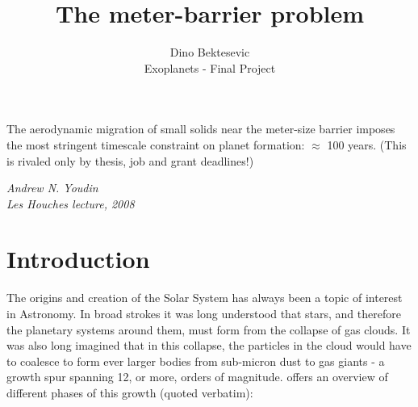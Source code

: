 \documentclass[12pt]{article}
\begin{document}
\title{The meter-barrier problem}
\author{Dino Bektesevic \\ 
Exoplanets - Final Project}
\maketitle


\epigraph{\centering The aerodynamic migration of small solids near the meter-size barrier imposes the most stringent timescale constraint on planet formation: $\approx$ 100 years. (This is rivaled only by thesis, job and grant deadlines!)}{\textit{Andrew N. Youdin \\ Les Houches lecture, 2008}}
\newpage

\section{Introduction}

The origins and creation of the Solar System has always been a topic of interest in Astronomy. In broad strokes it was long understood that stars, and therefore the planetary systems around them, must form from the collapse of gas clouds. It was also long imagined that in this collapse, the particles in the cloud would have to coalesce to form ever larger bodies from sub-micron dust to gas giants - a growth spur spanning 12, or more, orders of magnitude. \citet{Armitage07} offers an overview of different phases of this growth (quoted verbatim):
\end{document}
